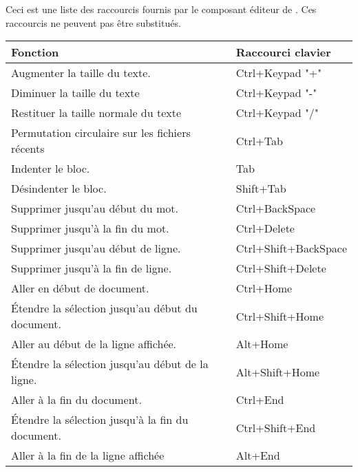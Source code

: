 Ceci est une liste des raccourcis fournis par le composant éditeur de \codeblocks. Ces raccourcis ne peuvent pas être substitués.

{\small
\begin{longtable}{|l|l|}\hline
\textbf{Fonction}		                        &	\textbf{Raccourci clavier}  \\ \hline
\endhead    %
Augmenter la taille du texte. 	                &   Ctrl+Keypad "+"             \\ \hline
Diminuer la taille du texte                     &   Ctrl+Keypad "-"             \\ \hline
Restituer la taille normale du texte            &   Ctrl+Keypad "/"             \\ \hline
Permutation circulaire sur les fichiers récents &   Ctrl+Tab                    \\ \hline
Indenter le bloc. 	                            &   Tab                         \\ \hline
Désindenter le bloc.                            &   Shift+Tab                   \\ \hline
Supprimer jusqu'au début du mot.                &   Ctrl+BackSpace              \\ \hline
Supprimer jusqu'à la fin du mot.                &   Ctrl+Delete                 \\ \hline
Supprimer jusqu'au début de ligne.              &   Ctrl+Shift+BackSpace        \\ \hline
Supprimer jusqu'à la fin de ligne.              &   Ctrl+Shift+Delete           \\ \hline
Aller en début de document. 	                &   Ctrl+Home                   \\ \hline
Étendre la sélection jusqu'au début du document.&   Ctrl+Shift+Home             \\ \hline
Aller au début de la ligne affichée.            &   Alt+Home                    \\ \hline
Étendre la sélection jusqu'au début de la ligne.&   Alt+Shift+Home              \\ \hline
Aller à la fin du document. 	                &   Ctrl+End                    \\ \hline
Étendre la sélection jusqu'à la fin du document.&   Ctrl+Shift+End              \\ \hline
Aller à la fin de la ligne affichée             &   Alt+End                     \\ \hline

\end{longtable}}
